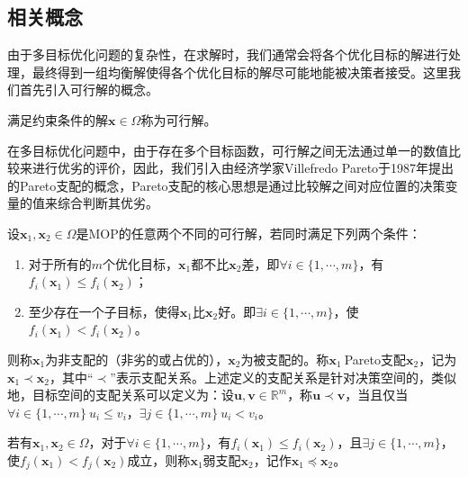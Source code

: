 \subsection{相关概念}
\label{subsec:背景介绍:多目标优化问题:相关概念}
由于多目标优化问题的复杂性，在求解时，我们通常会将各个优化目标的解进行处理，最终得到一组均衡解使得各个优化目标的解尽可能地能被决策者接受。这里我们首先引入可行解的概念。
\begin{definition}[可行解]
    \label{def:可行解}
    满足约束条件的解$\mathbf{x} \in \Omega$称为可行解。
\end{definition}
\par
在多目标优化问题中，由于存在多个目标函数，可行解之间无法通过单一的数值比较来进行优劣的评价，因此，我们引入由经济学家Villefredo Pareto于1987年提出的Pareto支配的概念，Pareto支配的核心思想是通过比较解之间对应位置的决策变量的值来综合判断其优劣。
\begin{definition}[Pareto支配]
    \label{def:Pareto支配}
    设$\mathbf{x}_1, \mathbf{x}_2 \in \Omega$是MOP的任意两个不同的可行解，若同时满足下列两个条件：
    \begin{enumerate}
        \item 对于所有的$m$个优化目标，$\mathbf{x}_1$都不比$\mathbf{x}_2$差，即$\forall i \in \{ 1, \cdots, m \}$，有$f_i(\mathbf{x}_1) \leq f_i(\mathbf{x}_2)$；
        \item 至少存在一个子目标，使得$\mathbf{x}_1$比$\mathbf{x}_2$好。即$\exists i \in \{ 1, \cdots, m \}$，使$f_i(\mathbf{x}_1) < f_i(\mathbf{x}_2)$。
    \end{enumerate}
    则称$\mathbf{x}_1$为非支配的（非劣的或占优的），$\mathbf{x}_2$为被支配的。称$\mathbf{x}_1 \ $Pareto支配$\mathbf{x}_2$，记为$\mathbf{x}_1 \prec \mathbf{x}_2$，其中“$\prec$”表示支配关系。上述定义的支配关系是针对决策空间的，类似地，目标空间的支配关系可以定义为：设$\mathbf{u}, \mathbf{v} \in \mathbb{R}^m$，称$\mathbf{u} \prec \mathbf{v}$，当且仅当$\forall i \in \{ 1, \cdots, m \} \ u_i \leq v_i$，$\exists j \in  \{ 1, \cdots, m \} \ u_i < v_i$。
\end{definition}
\par
\begin{definition}[弱支配]
    \label{def:弱支配}
    若有$\mathbf{x}_1,\mathbf{x}_2 \in \Omega$，对于$\forall i \in \{ 1, \cdots, m \}$，有$f_i(\mathbf{x}_1) \leq f_i(\mathbf{x}_2)$，且$\exists j \in \{ 1, \cdots, m\}$，使$f_j(\mathbf{x}_1) < f_j(\mathbf{x}_2)$成立，则称$\mathbf{x}_1$弱支配$\mathbf{x}_2$，记作$\mathbf{x}_1 \preceq \mathbf{x}_2$。
\end{definition}
